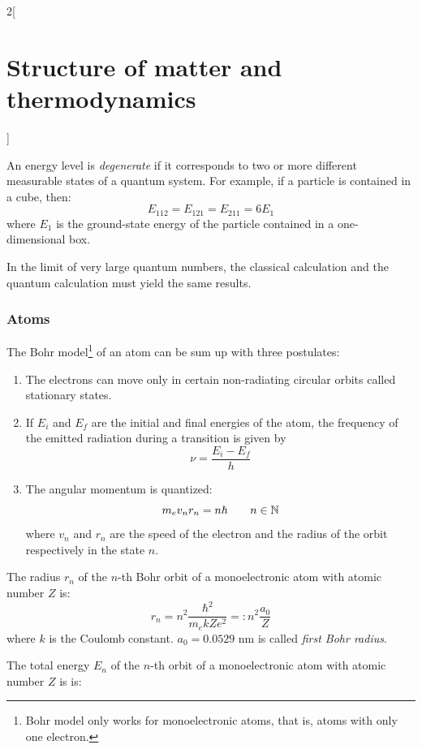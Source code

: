\documentclass[../../../main.tex]{subfiles}
\begin{document}
\begin{multicols}{2}[\section{Structure of matter and thermodynamics}]
\begin{prop}
    \end{prop}
    \begin{definition}
        An energy level is \textit{degenerate} if it corresponds to two or more different measurable states of a quantum system. For example, if a particle is contained in a cube, then: $$E_{112}=E_{121}=E_{211}=6E_1$$ where $E_1$ is the ground-state energy of the particle contained in a one-dimensional box.
    \end{definition}
    \begin{prop}
        In the limit of very large quantum numbers, the classical calculation and the quantum calculation must yield the same results.
    \end{prop}
    \subsubsection*{Atoms}
    \begin{definition}
        The Bohr model\footnote{Bohr model only works for monoelectronic atoms, that is, atoms with only one electron.} of an atom can be sum up with three postulates:
        \begin{enumerate}
            \item The electrons can move only in certain non-radiating circular orbits called stationary states.
            \item If $E_i$ and $E_f$ are the initial and final energies of the atom, the frequency of the emitted radiation during a transition is given by $$\nu=\frac{E_i-E_f}{h}$$
            \item The angular momentum is quantized: $$m_ev_nr_n=n\hbar\qquad n\in\mathbb{N}$$ where $v_n$ and $r_n$ are the speed of the electron and the radius of the orbit respectively in the state $n$.
        \end{enumerate}
    \end{definition}
    \begin{prop}
        The radius $r_n$ of the $n$-th Bohr orbit of a monoelectronic atom with atomic number $Z$ is: $$r_n=n^2\frac{\hbar^2}{m_ekZe^2}=:n^2\frac{a_0}{Z}$$
        where $k$ is the Coulomb constant. $a_0=0.0529\text{ nm}$ is called \textit{first Bohr radius}.
    \end{prop}
    \begin{prop}
        The total energy $E_n$ of the $n$-th orbit of a monoelectronic atom with atomic number $Z$ is is:
        \begin{equation}\label{SMT-energy_levels}

\end{equation}
\end{prop}
\end{multicols}
\end{document}
